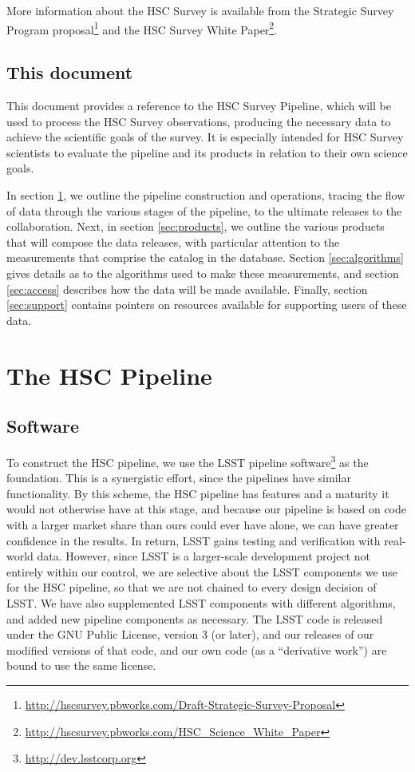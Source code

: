 \documentclass[12pt]{article}
\begin{document}
More information about the HSC Survey is available from the Strategic Survey Program
proposal\footnote{\url{http://hscsurvey.pbworks.com/Draft-Strategic-Survey-Proposal}} and the HSC Survey White
Paper\footnote{\url{http://hscsurvey.pbworks.com/HSC_Science_White_Paper}}.

\subsection{This document}

This document provides a reference to the HSC Survey Pipeline, which will be
used to process the HSC Survey observations, producing the necessary
data to achieve the scientific goals of the survey.  It is
especially intended for HSC Survey scientists to evaluate the pipeline
and its products in relation to their own science goals.

In section \ref{sec:pipeline}, we outline the pipeline construction and operations, tracing the flow of data
through the various stages of the pipeline, to the ultimate releases to the collaboration.  Next, in section
\ref{sec:products}, we outline the various products that will compose the data releases, with particular
attention to the measurements that comprise the catalog in the database.  Section \ref{sec:algorithms} gives
details as to the algorithms used to make these measurements, and section \ref{sec:access} describes how
the data will be made available.  Finally, section \ref{sec:support} contains pointers on resources available
for supporting users of these data.


\section{The HSC Pipeline}
\label{sec:pipeline}
\subsection{Software}


To construct the HSC pipeline, we use the LSST pipeline software\footnote{\url{http://dev.lsstcorp.org}}
as the foundation.  This is a synergistic
effort, since the pipelines have similar functionality.  By this scheme, the HSC pipeline has features and a
maturity it would not otherwise have at this stage, and because our pipeline is based on code with a larger
market share than ours could ever have alone, we can have greater confidence in the results.  In return, LSST
gains testing and verification with real-world data.  However, since LSST is a larger-scale development
project not entirely within our control, we are selective about the LSST components we use for the HSC
pipeline, so that we are not chained to every design decision of LSST.  We have also supplemented LSST
components with different algorithms, and added new pipeline components as necessary.  The LSST code is
released under the GNU Public License, version 3 (or later), and our releases of our modified versions of that
code, and our own code (as a ``derivative work'') are bound to use the same license.
\end{document}
